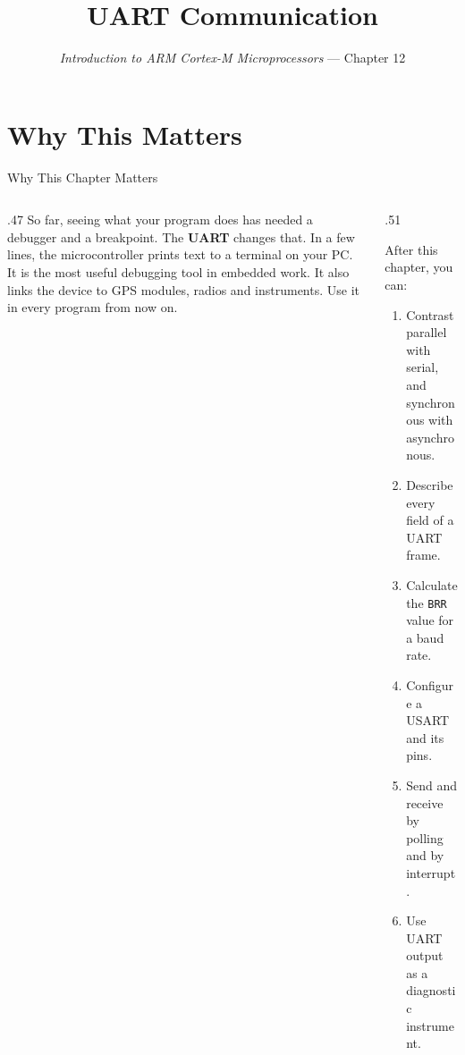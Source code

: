 \documentclass[9pt,aspectratio=169,xcolor=table]{beamer}
\title{UART Communication}
\subtitle{\emph{Introduction to ARM Cortex-M Microprocessors} --- Chapter 12}
\begin{document}
\titlepage

\section{Why This Matters}

\begin{frame}{Why This Chapter Matters}
    \begin{columns}[T]
    \begin{column}{.47\textwidth}
        {\normalsize So far, seeing what your program does has needed a debugger and a breakpoint. The \textbf{UART} changes that. In a few lines, the microcontroller prints text to a terminal on your PC. It is the most useful debugging tool in embedded work. It also links the device to GPS modules, radios and instruments. Use it in every program from now on.}
    \end{column}
    \begin{column}{.51\textwidth}
        \begin{block}{After this chapter, you can:}
        {\small
        \begin{enumerate}\itemsep2pt
            \item Contrast parallel with serial, and synchronous with asynchronous.
            \item Describe every field of a UART frame.
            \item Calculate the \texttt{BRR} value for a baud rate.
            \item Configure a USART and its pins.
            \item Send and receive by polling and by interrupt.
            \item Use UART output as a diagnostic instrument.
        \end{enumerate}}
        \end{block}
    \end{column}
    \end{columns}
\end{frame}
\end{document}
